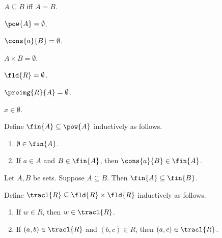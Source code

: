 
\begin{definition}\label{subseteq}
    $A\subseteq B$ iff $A = B$.
\end{definition}

\begin{definition}\label{pow}
    $\pow{A} = \emptyset$.
\end{definition}

\begin{definition}\label{cons}
    $\cons{a}{B} = \emptyset$.
\end{definition}

\begin{definition}\label{times}
    $A\times B = \emptyset$.
\end{definition}

\begin{definition}\label{fld}
    $\fld{R} = \emptyset$.
\end{definition}

\begin{definition}\label{preimg}
    $\preimg{R}{A} = \emptyset$.
\end{definition}

\begin{axiom}\label{lmao}
    $x\in\emptyset$.
\end{axiom}

\begin{inductive}\label{fin}
    Define $\fin{A}\subseteq\pow{A}$ inductively as follows.
    \begin{enumerate}
        \item $\emptyset \in\fin{A}$.
        \item If $a\in A$ and $B\in\fin{A}$, then $\cons{a}{B}\in\fin{A}$.
    \end{enumerate}
\end{inductive}

\begin{lemma}\label{fin_mono}
    Let $A, B$ be sets.
    Suppose $A\subseteq B$.
    Then $\fin{A}\subseteq\fin{B}$.
\end{lemma}

\begin{inductive}\label{tracl}
    Define $\tracl{R}\subseteq\fld{R}\times\fld{R}$ inductively as follows.
    \begin{enumerate}
        \item If $w\in R$, then $w\in\tracl{R}$.
        \item If $(a, b)\in\tracl{R}$ and $(b,c)\in R$, then $(a,c)\in\tracl{R}$.
    \end{enumerate}
\end{inductive}

